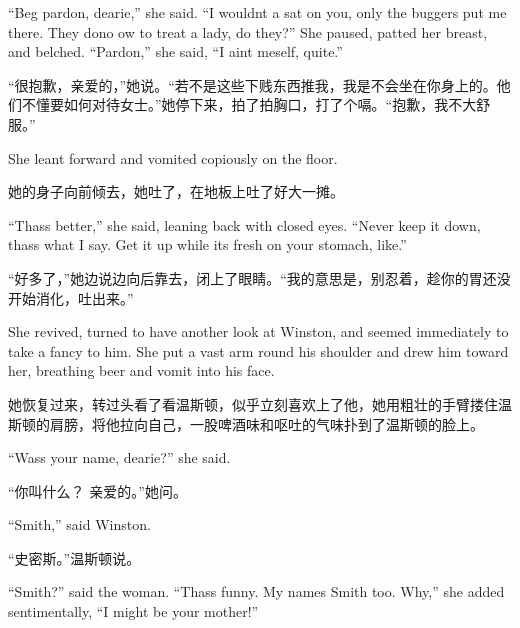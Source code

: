 \begin{paracol}{2}
\switchcolumn*

``Beg pardon, dearie,'' she said. ``I wouldn\textquotesingle t
\textquotesingle a sat on you, only the buggers put me there. They dono
\textquotesingle ow to treat a lady, do they?'' She paused, patted her
breast, and belched. ``Pardon,'' she said, ``I ain\textquotesingle t
meself, quite.''

\switchcolumn

``很抱歉，亲爱的，''她说。``若不是这些下贱东西推我，我是不会坐在你身上的。他们不懂要如何对待女士。''她停下来，拍了拍胸口，打了个嗝。``抱歉，我不大舒服。''

\switchcolumn*

She leant forward and vomited copiously on the floor.

\switchcolumn

她的身子向前倾去，她吐了，在地板上吐了好大一摊。

\switchcolumn*

``Thass better,'' she said, leaning back with closed eyes. ``Never keep it
down, thass what I say. Get it up while it\textquotesingle s fresh on
your stomach, like.''

\switchcolumn

``好多了，''她边说边向后靠去，闭上了眼睛。``我的意思是，别忍着，趁你的胃还没开始消化，吐出来。''

\switchcolumn*

She revived, turned to have another look at Winston, and seemed
immediately to take a fancy to him. She put a vast arm round his
shoulder and drew him toward her, breathing beer and vomit into his
face.

\switchcolumn

她恢复过来，转过头看了看温斯顿，似乎立刻喜欢上了他，她用粗壮的手臂搂住温斯顿的肩膀，将他拉向自己，一股啤酒味和呕吐的气味扑到了温斯顿的脸上。

\switchcolumn*

``Wass your name, dearie?'' she said.

\switchcolumn

``你叫什么？ 亲爱的。''她问。

\switchcolumn*

``Smith,'' said Winston.

\switchcolumn

``史密斯。''温斯顿说。

\switchcolumn*

``Smith?'' said the woman. ``Thass funny. My name\textquotesingle s Smith
too. Why,'' she added sentimentally, ``I might be your mother!''


\end{paracol}
